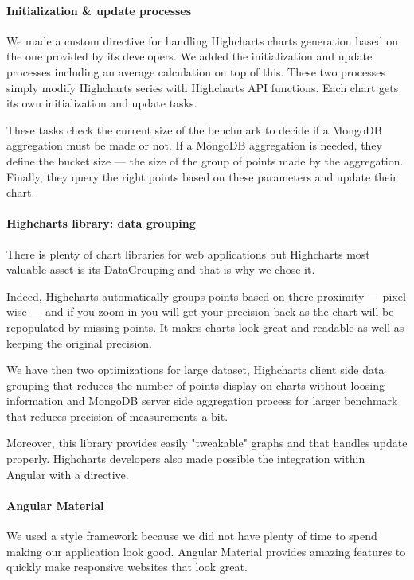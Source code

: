 \documentclass[a4paper,11pt]{report}
\begin{document}
\paragraph{Initialization \& update processes}

We made a custom directive for handling Highcharts charts generation based on the one provided by its developers. We added the initialization and update processes including an average calculation on top of this. These two processes simply modify Highcharts series with Highcharts API functions. Each chart gets its own initialization and update tasks.

These tasks check the current size of the benchmark to decide if a MongoDB aggregation must be made or not. If a MongoDB aggregation is needed, they define the bucket size --- the size of the group of points made by the aggregation. Finally, they query the right points based on these parameters and update their chart.

\paragraph{Highcharts library: data grouping}\label{data_grouping} There is plenty of chart libraries for web applications but Highcharts most valuable asset is its DataGrouping and that is why we chose it.

Indeed, Highcharts automatically groups points based on there proximity --- pixel wise --- and if you zoom in you will get your precision back as the chart will be repopulated by missing points. It makes charts look great and readable as well as keeping the original precision.

We have then two optimizations for large dataset, Highcharts client side data grouping that reduces the number of points display on charts without loosing information and MongoDB server side aggregation process for larger benchmark that reduces precision of measurements a bit.

Moreover, this library provides easily "tweakable" graphs and that handles update properly. Highcharts developers also made possible the integration within Angular with a directive.

\paragraph{Angular Material} We used a style framework because we did not have plenty of time to spend making our application look good. Angular Material provides amazing features to quickly make responsive websites that look great.
\end{document}
